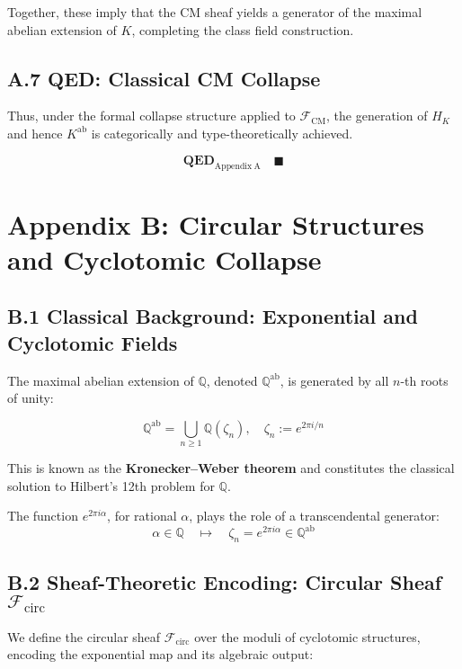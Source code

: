 \documentclass[11pt]{article}
\begin{document}
Together, these imply that the CM sheaf yields a generator of the maximal abelian extension of \( K \), completing the class field construction.

\subsection*{A.7 QED: Classical CM Collapse}

Thus, under the formal collapse structure applied to \( \mathcal{F}_{\mathrm{CM}} \), the generation of \( H_K \) and hence \( K^{\mathrm{ab}} \) is categorically and type-theoretically achieved.

\[
\textbf{QED}_{\mathrm{Appendix\ A}} \quad \blacksquare
\]



\appendix
\section*{Appendix B: Circular Structures and Cyclotomic Collapse}

\subsection*{B.1 Classical Background: Exponential and Cyclotomic Fields}

The maximal abelian extension of \( \mathbb{Q} \), denoted \( \mathbb{Q}^{\mathrm{ab}} \), is generated by all \( n \)-th roots of unity:

\[
\mathbb{Q}^{\mathrm{ab}} = \bigcup_{n \geq 1} \mathbb{Q}(\zeta_n), \quad \zeta_n := e^{2\pi i/n}
\]

This is known as the \textbf{Kronecker–Weber theorem} and constitutes the classical solution to Hilbert’s 12th problem for \( \mathbb{Q} \).

The function \( e^{2\pi i \alpha} \), for rational \( \alpha \), plays the role of a transcendental generator:
\[
\alpha \in \mathbb{Q} \quad \mapsto \quad \zeta_n = e^{2\pi i \alpha} \in \mathbb{Q}^{\mathrm{ab}}
\]

\subsection*{B.2 Sheaf-Theoretic Encoding: Circular Sheaf \( \mathcal{F}_{\mathrm{circ}} \)}

We define the circular sheaf \( \mathcal{F}_{\mathrm{circ}} \) over the moduli of cyclotomic structures, encoding the exponential map and its algebraic output:
\end{document}
